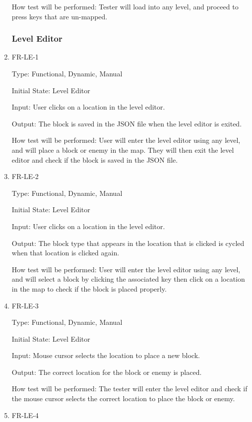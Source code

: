 \documentclass[12pt, titlepage]{article}
\begin{document}
\begin{enumerate}
How test will be performed: Tester will load into any level, and proceed to press keys that are un-mapped.

\color{Black}

\subsubsection{Level Editor}

\item{FR-LE-1}

Type: Functional, Dynamic, Manual

Initial State: Level Editor

Input: User clicks on a location in the level editor.

Output: The block is saved in the JSON file when the level editor is exited.

How test will be performed: User will enter the level editor using any level, and will place a block or enemy in the map. They will then exit the level editor and check if the block is saved in the JSON file.

\item{FR-LE-2}

Type: Functional, Dynamic, Manual

Initial State: Level Editor

Input: User clicks on a location in the level editor.

Output: The block type that appears in the location that is clicked is cycled when that location is clicked again.

How test will be performed: User will enter the level editor using any level, and will select a block by clicking the associated key then click on a location in the map to check if the block is placed properly.

\item{FR-LE-3}

Type: Functional, Dynamic, Manual

Initial State: Level Editor

Input: Mouse cursor selects the location to place a new block.

Output: The correct location for the block or enemy is placed.

How test will be performed: The tester will enter the level editor and check if the mouse cursor selects the correct location to place the block or enemy.

\item{FR-LE-4}


\end{enumerate}
\end{document}
